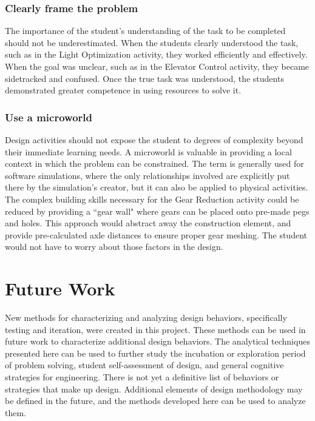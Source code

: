 \subsubsection{Clearly frame the problem}
The importance of the student's understanding of the task to be completed should not be underestimated. When the students clearly understood the task, such as in the Light Optimization activity, they worked efficiently and effectively. When the goal was unclear, such as in the Elevator Control activity, they became sidetracked and confused. Once the true task was understood, the students demonstrated greater competence in using resources to solve it. 

\subsubsection{Use a microworld}
Design activities should not expose the student to degrees of complexity beyond their immediate learning needs. A microworld is valuable in providing a local context in which the problem can be constrained. The term is generally used for software simulations, where the only relationships involved are explicitly put there by the simulation's creator, but it can also be applied to physical activities. The complex building skills necessary for the Gear Reduction activity could be reduced by providing a ``gear wall" where gears can be placed onto pre-made pegs and holes. This approach would abstract away the construction element, and provide pre-calculated axle distances to ensure proper gear meshing. The student would not have to worry about those factors in the design.

\section{Future Work}

New methods for characterizing and analyzing design behaviors, specifically testing and iteration, were created in this project. These methods can be used in future work to characterize additional design behaviors. The analytical techniques presented here can be used to further study the incubation or exploration period of problem solving, student self-assessment of design, and general cognitive strategies for engineering. There is not yet a definitive list of behaviors or strategies that make up design. Additional elements of design methodology may be defined in the future, and the methods developed here can be used to analyze them.

